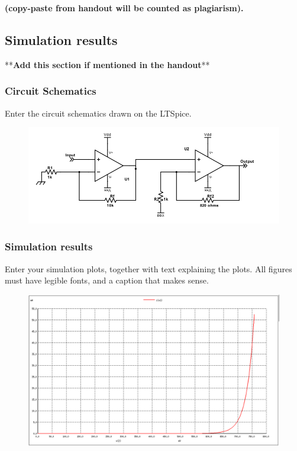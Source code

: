 \documentclass[12pt]{article}
\begin{document}
\textbf{(copy-paste from handout will be counted as plagiarism).} 



\subsection{Simulation results}%
**\textbf{Add this section if mentioned in the handout}**
\subsubsection{Circuit Schematics}
Enter the circuit schematics drawn on the LTSpice.
\begin{figure}[h!]
\centering
\includegraphics[scale = 0.4]{hall_amp.png}
\end{figure}

\subsubsection{Simulation results}

Enter your simulation plots, together with text explaining the plots. All figures must have legible fonts, and a caption that makes sense.


\begin{figure}[h!]

\centering
\includegraphics[scale = 0.2]{normaldiode.png}
\end{figure}
  \newpage
\end{document}
